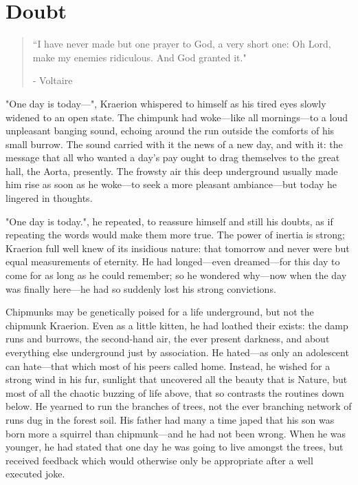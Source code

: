 \chapter{Doubt}

\vspace{-1.3cm}
\begin{localsize}{10}
	\begin{quote}
		“I have never made but one prayer to God, a very short one: Oh Lord, make my enemies ridiculous. And God granted it."
		\begin{flushright}- Voltaire \end{flushright}
	\end{quote}
\end{localsize}
\vspace{1cm}


"One day is today---", Kraerion whispered to himself as his tired eyes slowly widened to an open state. The chimpunk had woke---like all mornings---to a loud unpleasant banging sound, echoing around the run outside the comforts of his small burrow. The sound carried with it the news of a new day, and with it: the message that all who wanted a day's pay ought to drag themselves to the great hall, the Aorta, presently. The frowsty air this deep underground usually made him rise as soon as he woke---to seek a more pleasant ambiance---but today he lingered in thoughts.

"One day is today.", he repeated, to reassure himself and still his doubts, as if repeating the words would make them more true. The power of inertia is strong; Kraerion full well knew of its insidious nature: that tomorrow and never were but equal measurements of eternity. He had longed---even dreamed---for this day to come for as long as he could remember; so he wondered why---now when the day was finally here---he had so suddenly lost his strong convictions.

Chipmunks may be genetically poised for a life underground, but not the chipmunk Kraerion. Even as a little kitten, he had loathed their exists: the damp runs and burrows, the second-hand air, the ever present darkness, and about everything else underground just by association. He hated---as only an adolescent can hate---that which most of his peers called home.
Instead, he wished for a strong wind in his fur, sunlight that uncovered all the beauty that is Nature, but most of all the chaotic buzzing of life above, that so contrasts the routines down below. He yearned to run the branches of trees, not the ever branching network of runs dug in the forest soil. His father had many a time japed that his son was born more a squirrel than chipmunk---and he had not been wrong. When he was younger, he had stated that one day he was going to live amongst the trees, but received feedback which would otherwise only be appropriate after a well executed joke.

